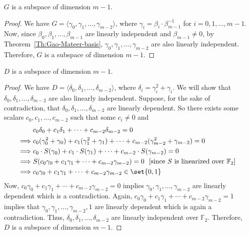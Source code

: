 \begin{corollary}
	$G$ is a subspace of dimension $m-1$.
\end{corollary}

\begin{proof}
	We have $G= \langle \gamma_0, \gamma_1, \ldots, \gamma_{m-2} \rangle$, where $\gamma_i= \beta_i\cdot \beta_{m-1}^{-1}$ for $i=0,1,\ldots,m-1$. Now, since $\beta_0,\beta_1,\ldots,\beta_{m-1}$ are linearly independent and $\beta_{m-1} \neq 0$, by Theorem~\ref{Th:Gao-Mateer-basis}, $\gamma_0,\gamma_1,\ldots,\gamma_{m-2}$ are also linearly independent. Therefore, $G$ is a subspace of dimension $m-1$.
\end{proof}

\begin{theorem}
	$D$ is a subspace of dimension $m-1$.
\end{theorem}

\begin{proof}
	We have $D = \langle \delta_0, \delta_1, \ldots, \delta_{m-2} \rangle$, where $\delta_i = \gamma_i^2 + \gamma_i$. We will show that $\delta_0,\delta_1,\ldots,\delta_{m-2}$ are also linearly independent. Suppose, for the sake of contradiction, that $\delta_0,\delta_1,\ldots,\delta_{m-2}$ are linearly dependent. So there exists some scalars $c_0,c_1,\ldots,c_{m-2}$ such that some $c_i\neq 0$ and
	\begin{equation*}
		\begin{aligned}
			&c_0 \delta_0+ c_1 \delta_1+ \cdots + c_{m-2} \delta_{m-2}=0\\
			\implies & c_0 (\gamma_0^2+\gamma_0)+ c_1 (\gamma_1^2+\gamma_1) + \cdots + c_{m-2} (\gamma_{m-2}^2+\gamma_{m-2}) =0\\
			\implies & c_0\cdot S(\gamma_0)+ c_1\cdot S(\gamma_1)+ \cdots+c_{m-2}\cdot S(\gamma_{m-2})=0\\
			\implies & S(c_0 \gamma_0+c_1\gamma_1+\cdots+c_{m-2}\gamma_{m-2})=0~~[\text{since}~S~\text{is linearized over } \mathbb{F}_{2}]\\
			\implies & c_0 \gamma_0+c_1\gamma_1+\cdots+c_{m-2}\gamma_{m-2} \in \set{0,1}
		\end{aligned}
	\end{equation*}
	Now, $c_0 \gamma_0+c_1\gamma_1+\cdots+c_{m-2}\gamma_{m-2}=0$ implies $\gamma_0,\gamma_1,\ldots,\gamma_{m-2}$ are linearly dependent which is a contradiction. Again, $c_0 \gamma_0+c_1\gamma_1+\cdots+c_{m-2}\gamma_{m-2}=1$ implies that $\gamma_0,\gamma_1,\ldots,\gamma_{m-2},1$ are linearly dependent which is again a contradiction. Thus, $\delta_0,\delta_1,\ldots,\delta_{m-2}$ are linearly independent over $\mathbb{F}_{2}$. Therefore, $D$ is a subspace of dimension $m-1$.
\end{proof}


